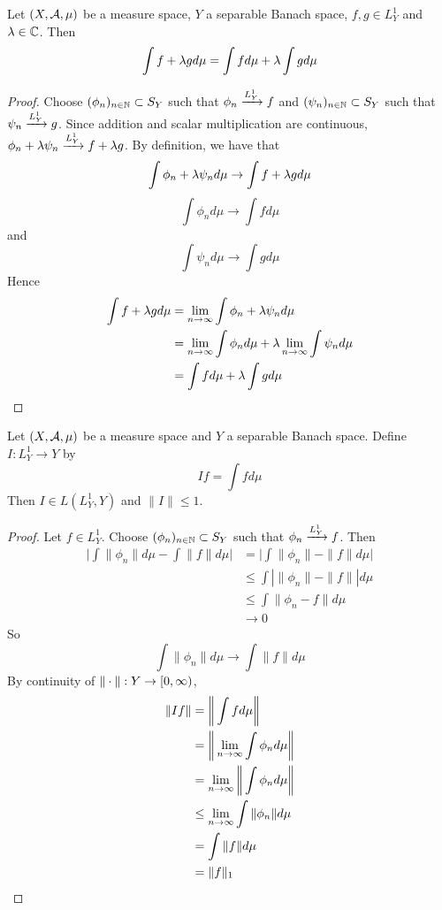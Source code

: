 \documentclass{book}
\begin{document}
	\begin{ex}  
	Let $(X, \mathcal{A}, \mu)$ be a measure space, $Y$ a separable Banach space, $f,g \in L^1_Y$ and $\lambda \in \mathbb{C}$. Then $$\int f+\lambda g d\mu = \int f d \mu + \lambda \int g d\mu$$
	\end{ex}
	
	\begin{proof}
	Choose $(\phi_n)_{n \in \mathbb{N}} \subset S_Y$ such that $\phi_n \xrightarrow{L^1_Y} f$ and $(\psi_n)_{n \in \mathbb{N}} \subset S_Y$ such that $\psi_n \xrightarrow{L^1_Y} g$. Since addition and  scalar multiplication are continuous, $\phi_n + \lambda \psi_n \xrightarrow{L^1_Y} f+\lambda g$. By definition, we have that $$\int \phi_n + \lambda \psi_n  d\mu \rightarrow \int f+\lambda g d\mu $$ $$\int \phi_n d\mu \rightarrow \int f d\mu$$ and $$ \int \psi_n d\mu \rightarrow \int g d\mu$$ 
	Hence 
	\begin{align*}
	\int f+ \lambda g d\mu 
	&= \lim \limits_{n \rightarrow \infty} \int \phi_n + \lambda \psi_n  d\mu \\
	&= \lim \limits_{n \rightarrow \infty} \int \phi_n d\mu + \lambda \lim \limits_{n \rightarrow \infty} \int \psi_n  d\mu \\
	&= \int f d\mu + \lambda \int g d\mu
	\end{align*}
	\end{proof}
	
	\begin{ex}  
	Let $(X, \mathcal{A}, \mu)$ be a measure space and $Y$ a separable Banach space. Define $I: L^1_Y \rightarrow Y$ by $$If = \int f d\mu$$
	Then $I \in L(L^1_Y, Y)$ and $\|I\| \leq 1$.
	\end{ex}
	
	\begin{proof}
	Let $f \in L^1_Y$. Choose $(\phi_n)_{n \in \mathbb{N}} \subset S_Y$ such that $\phi_n \xrightarrow{L^1_Y} f$. Then 
	\begin{align*}
	\bigg | \int \| \phi_n \| d \mu - \int \| f\| d\mu \bigg |
	&= \bigg | \int \| \phi_n \| - \| f\| d\mu \bigg | \\
	& \leq \int |\| \phi_n \| - \| f\| | d\mu \\
	& \leq  \int \| \phi_n - f\| d\mu \\
	& \rightarrow 0
	\end{align*}
	So  $$ \int \| \phi_n \| d \mu \rightarrow  \int \| f \| d \mu$$
	By continuity of $\|\cdot\|:Y \rightarrow [0,\infty)$,
	\begin{align*}
	\|I f\|
	& = \bigg \| \int f d\mu \bigg \| \\
	&= \bigg \| \lim \limits_{n \rightarrow \infty} \int \phi_n d\mu \bigg \| \\
	&= \lim \limits_{n \rightarrow \infty}  \bigg \| \int \phi_n d\mu \bigg \| \\
	& \leq \lim \limits_{n \rightarrow \infty} \int \| \phi_n \| d \mu \\
	&= \int \| f \| d\mu  \\
	&= \|f\|_1
	\end{align*}
	\end{proof}
\end{document}
